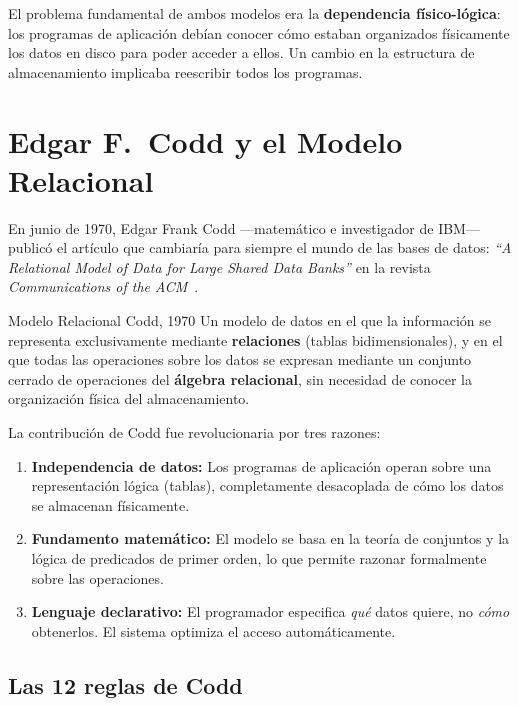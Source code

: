 El problema fundamental de ambos modelos era la
\textbf{dependencia físico-lógica}: los programas de aplicación
debían conocer cómo estaban organizados físicamente los datos en
disco para poder acceder a ellos. Un cambio en la estructura de
almacenamiento implicaba reescribir todos los programas.

\section{Edgar F.\ Codd y el Modelo Relacional}

En junio de 1970, Edgar Frank Codd —matemático e investigador
de IBM— publicó el artículo que cambiaría para siempre el mundo de
las bases de datos:
\textit{``A Relational Model of Data for Large Shared Data Banks''}
en la revista \textit{Communications of the ACM}~\cite{codd1970}.

\begin{definicion}{Modelo Relacional Codd, 1970}
Un modelo de datos en el que la información se representa
exclusivamente mediante \textbf{relaciones} (tablas bidimensionales),
y en el que todas las operaciones sobre los datos se expresan
mediante un conjunto cerrado de operaciones del
\textbf{álgebra relacional}, sin necesidad de conocer la
organización física del almacenamiento.
\end{definicion}

La contribución de Codd fue revolucionaria por tres razones:

\begin{enumerate}
  \item \textbf{Independencia de datos:} Los programas de aplicación
    operan sobre una representación lógica (tablas), completamente
    desacoplada de cómo los datos se almacenan físicamente.

  \item \textbf{Fundamento matemático:} El modelo se basa en la
    teoría de conjuntos y la lógica de predicados de primer orden,
    lo que permite razonar formalmente sobre las operaciones.

  \item \textbf{Lenguaje declarativo:} El programador especifica
    \emph{qué} datos quiere, no \emph{cómo} obtenerlos.
    El sistema optimiza el acceso automáticamente.
\end{enumerate}

\subsection{Las 12 reglas de Codd}

